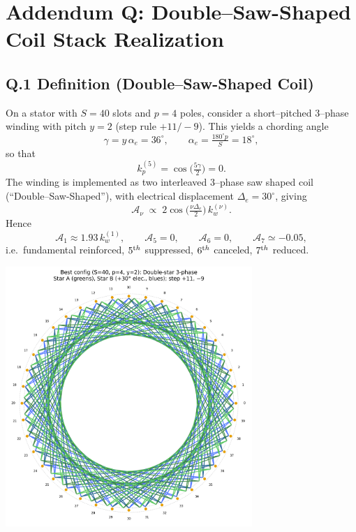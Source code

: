\documentclass[reprint,aps,onecolumn,nofootinbib]{revtex4-2}
\begin{document}
\section*{Addendum Q: Double--Saw-Shaped Coil Stack Realization}
\label{sec:addendumQ}

\subsection*{Q.1 Definition (Double--Saw-Shaped Coil)}
On a stator with $S=40$ slots and $p=4$ poles, consider a short--pitched
3--phase winding with pitch $y=2$ (step rule $+11/ -9$).
This yields a chording angle
\[
	\gamma = y\,\alpha_e = 36^\circ,
	\qquad
	\alpha_e = \tfrac{180^\circ p}{S} = 18^\circ,
\]
so that
\[
	k_p^{(5)}=\cos\!\big(\tfrac{5\gamma}{2}\big)=0.
\]
The winding is implemented as two interleaved 3--phase saw shaped coil (``Double--Saw-Shaped''),
with electrical displacement $\Delta_e=30^\circ$, giving
\[
	\mathcal A_\nu \;\propto\; 2\cos\!\Big(\tfrac{\nu\Delta_e}{2}\Big)\,k_w^{(\nu)}.
\]
Hence
\[
	\mathcal A_1 \approx 1.93\,k_w^{(1)},\qquad
	\mathcal A_5=0,\qquad
	\mathcal A_6=0,\qquad
	\mathcal A_7\simeq -0.05,
\]
i.e.\ fundamental reinforced, $5^{\textrm th}$ suppressed, $6^{\textrm th}$ canceled,
$7^{\textrm th}$ reduced.

\begin{center}
    \includegraphics[width=0.7\textwidth]{S40_double_star_best}
\end{center}
\end{document}

